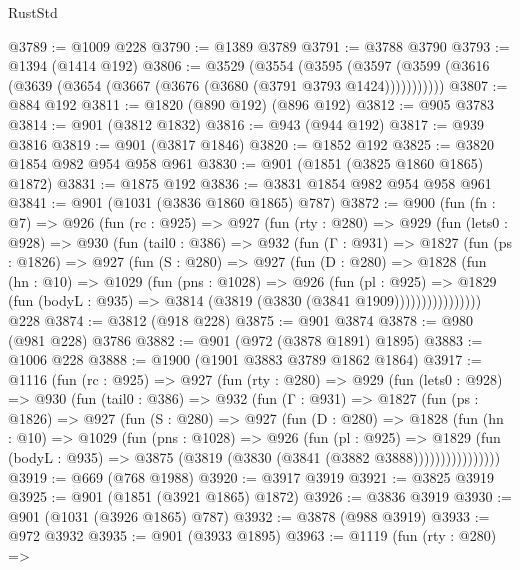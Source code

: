 \begin{lexlean}{RustStd}
\begin{coremodule}
@3789 := @1009 @228
@3790 := @1389 @3789
@3791 := @3788 @3790
@3793 := @1394 (@1414 @192)
@3806 := @3529
    (@3554
      (@3595 (@3597 (@3599 (@3616 (@3639 (@3654 (@3667 (@3676 (@3680 (@3791 @3793 @1424)))))))))))
@3807 := @884 @192
@3811 := @1820 (@890 @192) (@896 @192)
@3812 := @905 @3783
@3814 := @901 (@3812 @1832)
@3816 := @943 (@944 @192)
@3817 := @939 @3816
@3819 := @901 (@3817 @1846)
@3820 := @1852 @192
@3825 := @3820 @1854 @982 @954 @958 @961
@3830 := @901 (@1851 (@3825 @1860 @1865) @1872)
@3831 := @1875 @192
@3836 := @3831 @1854 @982 @954 @958 @961
@3841 := @901 (@1031 (@3836 @1860 @1865) @787)
@3872 := @900
    (fun (fn : @7) =>
    @926
      (fun (rc : @925) =>
      @927
        (fun (rty : @280) =>
        @929
          (fun (lets0 : @928) =>
          @930
            (fun (tail0 : @386) =>
            @932
              (fun (Γ : @931) =>
              @1827
                (fun (ps : @1826) =>
                @927
                  (fun (S : @280) =>
                  @927
                    (fun (D : @280) =>
                    @1828
                      (fun (hn : @10) =>
                      @1029
                        (fun (pns : @1028) =>
                        @926
                          (fun (pl : @925) =>
                          @1829
                            (fun (bodyL : @935) => @3814 (@3819 (@3830 (@3841 @1909))))))))))))))))
    @228
@3874 := @3812 (@918 @228)
@3875 := @901 @3874
@3878 := @980 (@981 @228) @3786
@3882 := @901 (@972 (@3878 @1891) @1895)
@3883 := @1006 @228
@3888 := @1900 (@1901 @3883 @3789 @1862 @1864)
@3917 := @1116
    (fun (rc : @925) =>
    @927
      (fun (rty : @280) =>
      @929
        (fun (lets0 : @928) =>
        @930
          (fun (tail0 : @386) =>
          @932
            (fun (Γ : @931) =>
            @1827
              (fun (ps : @1826) =>
              @927
                (fun (S : @280) =>
                @927
                  (fun (D : @280) =>
                  @1828
                    (fun (hn : @10) =>
                    @1029
                      (fun (pns : @1028) =>
                      @926
                        (fun (pl : @925) =>
                        @1829
                          (fun (bodyL : @935) =>
                          @3875 (@3819 (@3830 (@3841 (@3882 @3888))))))))))))))))
@3919 := @669 (@768 @1988)
@3920 := @3917 @3919
@3921 := @3825 @3919
@3925 := @901 (@1851 (@3921 @1865) @1872)
@3926 := @3836 @3919
@3930 := @901 (@1031 (@3926 @1865) @787)
@3932 := @3878 (@988 @3919)
@3933 := @972 @3932
@3935 := @901 (@3933 @1895)
@3963 := @1119
    (fun (rty : @280) =>

\end{coremodule}
\end{lexlean}
